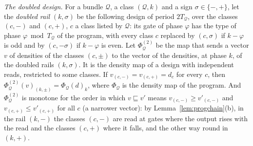 \documentclass[11pt]{amsart}
\theoremstyle{definition}
\theoremstyle{remark}
\begin{document}
\emph{The doubled design.} For a bundle $\mathcal Q$, a class $(\mathcal Q,k)$ and a sign
$\sigma\in\{-,+\}$, let the \emph{doubled rail} $(k,\sigma)$ be the following design of period
$2T_{\mathcal Q}$, over the classes $(c,-)$ and $(c,+)$, $c$ a class listed by $\mathcal Q$: its
gate of phase $\varphi$ has the type of phase $\varphi\bmod T_{\mathcal Q}$ of the program, with
every class $c$ replaced by $(c,\sigma)$ if $k-\varphi$ is odd and by $(c,-\sigma)$ if $k-\varphi$ is
even. Let $\Phi^{(2)}_{\mathcal Q}$ be the map that sends a vector $v$ of densities of the classes
$(c,\pm)$ to the vector of the densities, at phase $k$, of the doubled rails $(k,\sigma)$. It is
the density map of a design with independent reads, restricted to some classes. If
$v_{(c,-)}=v_{(c,+)}=d_c$ for every $c$, then $\Phi^{(2)}_{\mathcal Q}(v)_{(k,\pm)}=\Phi_{\mathcal Q}(d)_k$,
where $\Phi_{\mathcal Q}$ is the density map of the program. And $\Phi^{(2)}_{\mathcal Q}$ is
monotone for the order in which $v\sqsubseteq v'$ means $v_{(c,-)}\ge v'_{(c,-)}$ and
$v_{(c,+)}\le v'_{(c,+)}$ for all $c$ (a narrower vector): by Lemma~\ref{lem:progchain}(b), in the
rail $(k,-)$ the classes $(c,-)$ are read at gates where the output rises with the read and the
classes $(c,+)$ where it falls, and the other way round in $(k,+)$.
\end{document}
